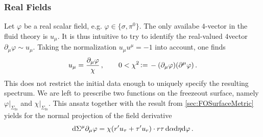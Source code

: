 \subsubsection{Real Fields}
\label{sec:FluidFromRealScalar}

Let $\varphi$ be a real scalar field, e.g. ${\varphi\in\{\sigma,\pi^0\}}$. The only availabe $4$-vector in the fluid theory is $u_\mu$. It is thus intuitive to try to identify the real-valued $4$vector ${\partial_\mu\varphi\sim u_\mu}$. Taking the normalization ${u_\mu u^\mu=-1}$ into account, one finds
\begin{equation}
    u_\mu=\frac{\partial_\mu\varphi}{\chi}\,,\qquad0<\chi^2{\,\vcentcolon=\,}-(\partial_\mu\varphi)(\partial^\mu\varphi)\,.
\end{equation}
This does not restrict the initial data enough to uniquely specify the resulting spectrum. We are left to prescribe two functions on the freezeout surface, namely $\varphi\vert_{\Sigma_{\text{fo}}}$ and $\chi\vert_{\Sigma_{\text{fo}}}$. This ansatz together with the result from \ref{sec:FOSurfaceMetric} yields for the normal projection of the field derivative
\begin{equation}
    \text{d}\Sigma^\mu\partial_\mu\varphi=\chi(r^\prime u_\tau+\tau^\prime u_r)\cdot r\tau\,\text{d}\alpha\text{d}\eta\text{d}\varphi\,.
\end{equation}

